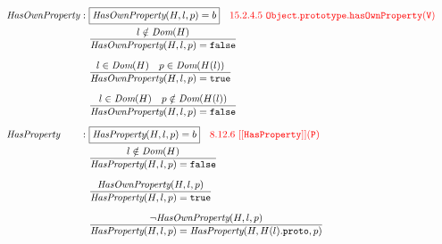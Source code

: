\documentclass[a4paper, leqno]{amsart}
\def\inred{\color{red}}
\newcommand{\false}{{\tt false}}
\newcommand{\true}{{\tt true}}
\newcommand{\bool}{\emph{Bool}}
\newcommand{\loc}{\emph{Loc}}
\newcommand{\dom}{\emph{Dom}}
\begin{document}
{\[\begin{array}{l@{}l@{}ll}
\emph{HasOwnProperty} & \ : \ & \fbox{$\emph{HasOwnProperty}(H,l,p)=b$}
\quad{\inred 15.2.4.5\ {\tt Object.prototype.hasOwnProperty(V)}}
& \\[.5em]
 & \ \ & \frac{
    \begin{matrix}
       l \notin \dom(H)
    \end{matrix}}{
    \begin{matrix}
       \emph{HasOwnProperty}(H,l,p)=\false
    \end{matrix}} & \\[1.5em]
 & \ \ & \frac{
\begin{matrix}
   {l \in \dom(H)} & {p \in \dom(H(l))}
\end{matrix}}{\begin{matrix}{\emph{HasOwnProperty}(H,l,p)=\true} \end{matrix}} & \\[1.5em]
 & \ \ & \frac{
\begin{matrix}
   {l \in \dom(H)} & {p \notin \dom(H(l))}
\end{matrix}}{\begin{matrix}{\emph{HasOwnProperty}(H,l,p)=\false} \end{matrix}} & \\[1.5em]

\emph{HasProperty} & \ : \ & \fbox{$\emph{HasProperty}(H,l,p)=b$}
\quad{\inred 8.12.6\ {\tt[[HasProperty]](P)}}\\[.5em]
 & \ \ & \frac{
    \begin{matrix}
       {l \notin \dom(H)}
    \end{matrix}}{
    \begin{matrix}
       {\emph{HasProperty}(H,l,p)=\false}
    \end{matrix}} & \\[1.5em]
 & \ \ & \frac{
    \begin{matrix}
       {\emph{HasOwnProperty}(H,l,p)}
    \end{matrix}}{
    \begin{matrix}
       {\emph{HasProperty}(H,l,p)=\true}
    \end{matrix}} & \\[1.5em]
 & \ \ & \frac{
    \begin{matrix}
       {\neg \emph{HasOwnProperty}(H,l,p)}
    \end{matrix}}{
    \begin{matrix}
       {\emph{HasProperty}(H,l,p)=\emph{HasProperty}(H,H(l).{\tt proto},p)}
    \end{matrix}} & \\[1.5em]



\end{array}\]}
\end{document}
